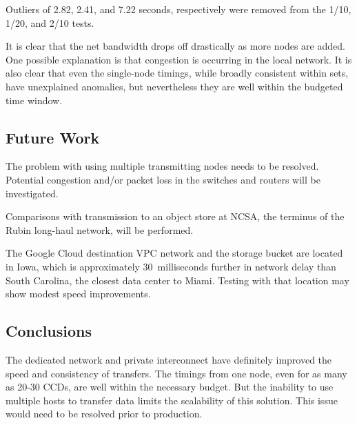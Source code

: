Outliers of 2.82, 2.41, and 7.22 seconds, respectively were removed from the 1/10, 1/20, and 2/10 tests.

It is clear that the net bandwidth drops off drastically as more nodes are added.
One possible explanation is that congestion is occurring in the local network.
It is also clear that even the single-node timings, while broadly consistent within sets, have unexplained anomalies, but nevertheless they are well within the budgeted time window.

\subsection{Future Work}

The problem with using multiple transmitting nodes needs to be resolved.
Potential congestion and/or packet loss in the switches and routers will be investigated.

Comparisons with transmission to an object store at NCSA, the terminus of the Rubin long-haul network, will be performed.

The Google Cloud destination VPC network and the storage bucket are located in Iowa, which is approximately 30~milliseconds further in network delay than South Carolina, the closest data center to Miami.
Testing with that location may show modest speed improvements.

\subsection{Conclusions}

The dedicated network and private interconnect have definitely improved the speed and consistency of transfers.
The timings from one node, even for as many as 20-30 CCDs, are well within the necessary budget.
But the inability to use multiple hosts to transfer data limits the scalability of this solution.
This issue would need to be resolved prior to production.
